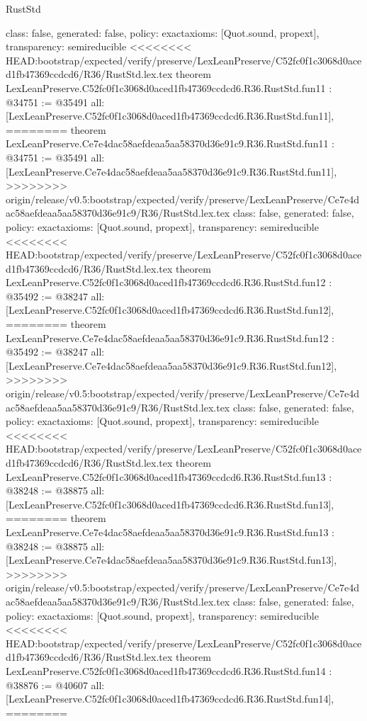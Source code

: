\begin{lexlean}{RustStd}
\begin{coremodule}
{\begin{coremodule}
{{{{{{{{{{{{{{  class: false,
  generated: false,
  policy: exact{axioms: [Quot.sound, propext]},
  transparency: semireducible
}
<<<<<<<< HEAD:bootstrap/expected/verify/preserve/LexLeanPreserve/C52fc0f1c3068d0aced1fb47369ccdcd6/R36/RustStd.lex.tex
theorem LexLeanPreserve.C52fc0f1c3068d0aced1fb47369ccdcd6.R36.RustStd.fun11 : @34751 := @35491 {
  all: [LexLeanPreserve.C52fc0f1c3068d0aced1fb47369ccdcd6.R36.RustStd.fun11],
========
theorem LexLeanPreserve.Ce7e4dac58aefdeaa5aa58370d36e91c9.R36.RustStd.fun11 : @34751 := @35491 {
  all: [LexLeanPreserve.Ce7e4dac58aefdeaa5aa58370d36e91c9.R36.RustStd.fun11],
>>>>>>>> origin/release/v0.5:bootstrap/expected/verify/preserve/LexLeanPreserve/Ce7e4dac58aefdeaa5aa58370d36e91c9/R36/RustStd.lex.tex
  class: false,
  generated: false,
  policy: exact{axioms: [Quot.sound, propext]},
  transparency: semireducible
}
<<<<<<<< HEAD:bootstrap/expected/verify/preserve/LexLeanPreserve/C52fc0f1c3068d0aced1fb47369ccdcd6/R36/RustStd.lex.tex
theorem LexLeanPreserve.C52fc0f1c3068d0aced1fb47369ccdcd6.R36.RustStd.fun12 : @35492 := @38247 {
  all: [LexLeanPreserve.C52fc0f1c3068d0aced1fb47369ccdcd6.R36.RustStd.fun12],
========
theorem LexLeanPreserve.Ce7e4dac58aefdeaa5aa58370d36e91c9.R36.RustStd.fun12 : @35492 := @38247 {
  all: [LexLeanPreserve.Ce7e4dac58aefdeaa5aa58370d36e91c9.R36.RustStd.fun12],
>>>>>>>> origin/release/v0.5:bootstrap/expected/verify/preserve/LexLeanPreserve/Ce7e4dac58aefdeaa5aa58370d36e91c9/R36/RustStd.lex.tex
  class: false,
  generated: false,
  policy: exact{axioms: [Quot.sound, propext]},
  transparency: semireducible
}
<<<<<<<< HEAD:bootstrap/expected/verify/preserve/LexLeanPreserve/C52fc0f1c3068d0aced1fb47369ccdcd6/R36/RustStd.lex.tex
theorem LexLeanPreserve.C52fc0f1c3068d0aced1fb47369ccdcd6.R36.RustStd.fun13 : @38248 := @38875 {
  all: [LexLeanPreserve.C52fc0f1c3068d0aced1fb47369ccdcd6.R36.RustStd.fun13],
========
theorem LexLeanPreserve.Ce7e4dac58aefdeaa5aa58370d36e91c9.R36.RustStd.fun13 : @38248 := @38875 {
  all: [LexLeanPreserve.Ce7e4dac58aefdeaa5aa58370d36e91c9.R36.RustStd.fun13],
>>>>>>>> origin/release/v0.5:bootstrap/expected/verify/preserve/LexLeanPreserve/Ce7e4dac58aefdeaa5aa58370d36e91c9/R36/RustStd.lex.tex
  class: false,
  generated: false,
  policy: exact{axioms: [Quot.sound, propext]},
  transparency: semireducible
}
<<<<<<<< HEAD:bootstrap/expected/verify/preserve/LexLeanPreserve/C52fc0f1c3068d0aced1fb47369ccdcd6/R36/RustStd.lex.tex
theorem LexLeanPreserve.C52fc0f1c3068d0aced1fb47369ccdcd6.R36.RustStd.fun14 : @38876 := @40607 {
  all: [LexLeanPreserve.C52fc0f1c3068d0aced1fb47369ccdcd6.R36.RustStd.fun14],
========
}}}}}}}}}}}}}}}}}
\end{coremodule}}
\end{coremodule}
\end{lexlean}
